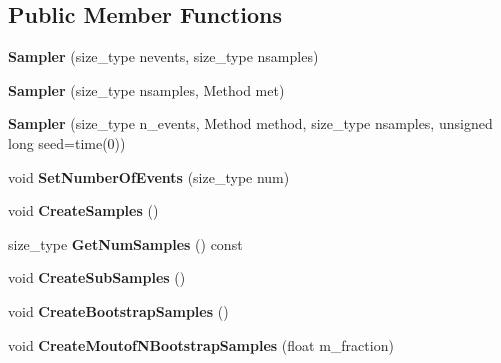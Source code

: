 \subsection*{Public Member Functions}
\begin{DoxyCompactItemize}
\item 
\mbox{\label{classQn_1_1Sampler_ad3257addf47d7336d6758711c6e630e4}} 
{\bfseries Sampler} (size\+\_\+type nevents, size\+\_\+type nsamples)
\item 
\mbox{\label{classQn_1_1Sampler_ad6645e5f41c1e0918f373723a435540c}} 
{\bfseries Sampler} (size\+\_\+type nsamples, Method met)
\item 
\mbox{\label{classQn_1_1Sampler_aa5892fc9e201aedf2d4d2f1b6bc9ac75}} 
{\bfseries Sampler} (size\+\_\+type n\+\_\+events, Method method, size\+\_\+type nsamples, unsigned long seed=time(0))
\item 
\mbox{\label{classQn_1_1Sampler_a93efc50f83024cdc757d3553155c6e07}} 
void {\bfseries Set\+Number\+Of\+Events} (size\+\_\+type num)
\item 
\mbox{\label{classQn_1_1Sampler_a30dead3c37604973ae89f339cc733c93}} 
void {\bfseries Create\+Samples} ()
\item 
\mbox{\label{classQn_1_1Sampler_a1993d5942aea552b89f44a904af1b2d9}} 
size\+\_\+type {\bfseries Get\+Num\+Samples} () const
\item 
\mbox{\label{classQn_1_1Sampler_ac569f34bfcdc1895a828ff452281830b}} 
void {\bfseries Create\+Sub\+Samples} ()
\item 
\mbox{\label{classQn_1_1Sampler_a97a202fb9bd736888d6150d99a239988}} 
void {\bfseries Create\+Bootstrap\+Samples} ()
\item 
\mbox{\label{classQn_1_1Sampler_ac3f924d5848075a864b92d6cc6dafc31}} 
void {\bfseries Create\+Moutof\+N\+Bootstrap\+Samples} (float m\+\_\+fraction)
\item 
\mbox{\label{classQn_1_1Sampler_afdc08607db98336cbdd1fdd7944eece7}} 

\end{DoxyCompactItemize}
